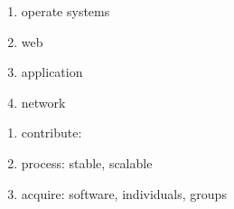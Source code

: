 \documentclass[draftclsnofoot,journal,onecolumn,12pt]{IEEEtran}
\begin{document}
\begin{enumerate}
  \item operate systems
  \item web
  \item application
  \item network
\end{enumerate}

\begin{enumerate}
  \item contribute:
  \item process: stable, scalable
  \item acquire: software, individuals, groups
\end{enumerate}


\nocite{Bonaccorsi20031243}
\nocite{chacon2009pro}
\nocite{Hertel20031159}
\nocite{kernighan1999practice}
\nocite{Kogut01062001}
\nocite{scacchi2006understanding}
\nocite{vonKrogh20031149}
\nocite{Yilmaz06techniquesand}

\renewcommand\refname{References}


\end{document}
